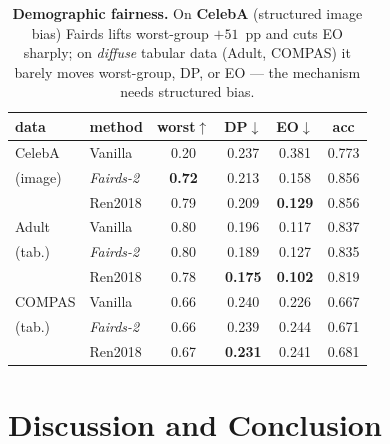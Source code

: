 \documentclass[letterpaper]{article}
\begin{document}
\begin{table}[t]
\centering\footnotesize
\setlength{\tabcolsep}{4pt}
\begin{tabular}{llcccc}
\toprule
data & method & worst$\uparrow$ & DP$\downarrow$ & EO$\downarrow$ & acc \\
\midrule
CelebA  & Vanilla          & 0.20 & 0.237 & 0.381 & 0.773 \\
(image) & \textit{Fairds-2}& \textbf{0.72} & 0.213 & 0.158 & 0.856 \\
        & Ren2018          & 0.79 & 0.209 & \textbf{0.129} & 0.856 \\
\midrule
Adult   & Vanilla          & 0.80 & 0.196 & 0.117 & 0.837 \\
(tab.)  & \textit{Fairds-2}& 0.80 & 0.189 & 0.127 & 0.835 \\
        & Ren2018          & 0.78 & \textbf{0.175} & \textbf{0.102} & 0.819 \\
\midrule
COMPAS  & Vanilla          & 0.66 & 0.240 & 0.226 & 0.667 \\
(tab.)  & \textit{Fairds-2}& 0.66 & 0.239 & 0.244 & 0.671 \\
        & Ren2018          & 0.67 & \textbf{0.231} & 0.241 & 0.681 \\
\bottomrule
\end{tabular}
\caption{\textbf{Demographic fairness.} On \textbf{CelebA} (structured image bias)
Fairds lifts worst-group $+51$~pp and cuts EO sharply; on \emph{diffuse} tabular
data (Adult, COMPAS) it barely moves worst-group, DP, or EO --- the mechanism needs
structured bias.}
\label{tab:demo}
\end{table}

\section{Discussion and Conclusion}
\end{document}
